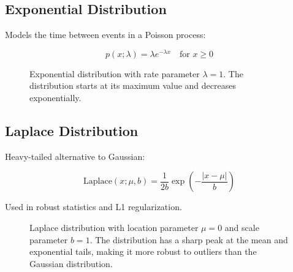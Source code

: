 \subsection{Exponential Distribution}

Models the time between events in a Poisson process:

\begin{equation}
p(x; \lambda) = \lambda e^{-\lambda x} \quad \text{for } x \geq 0
\end{equation}

\begin{figure}[h]
\centering
{}
\caption{Exponential distribution with rate parameter $\lambda = 1$. The distribution starts at its maximum value and decreases exponentially.}
\label{fig:exponential-distribution}
\end{figure}

\subsection{Laplace Distribution}

Heavy-tailed alternative to Gaussian:

\begin{equation}
\text{Laplace}(x; \mu, b) = \frac{1}{2b} \exp\left(-\frac{|x-\mu|}{b}\right)
\end{equation}

Used in robust statistics and L1 regularization.

\begin{figure}[h]
\centering
{}
\caption{Laplace distribution with location parameter $\mu = 0$ and scale parameter $b = 1$. The distribution has a sharp peak at the mean and exponential tails, making it more robust to outliers than the Gaussian distribution.}
\label{fig:laplace-distribution}
\end{figure}

